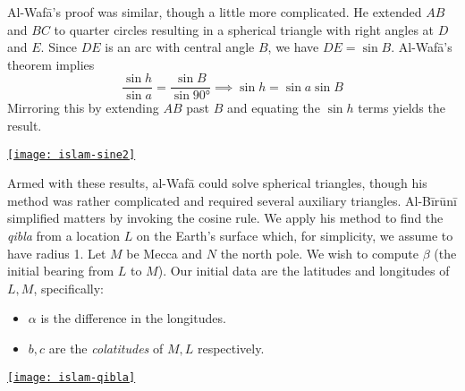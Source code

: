 \begin{minipage}[t]{0.65\linewidth}\vspace{0pt}
	Al-Wafā's proof was similar, though a little more complicated. He extended $AB$ and $BC$ to quarter circles resulting in a spherical triangle with right angles at $D$ and $E$. Since $DE$ is an arc with central angle $B$, we have $DE=\sin B$. Al-Wafā's theorem implies
	\[
		\frac{\sin h}{\sin a}=\frac{\sin B}{\sin \ang{90}}\implies \sin h=\sin a\sin B
	\]
	Mirroring this by extending $AB$ past $B$ and equating the $\sin h$ terms yields the result.
\end{minipage}
\hfill
\begin{minipage}[t]{0.34\linewidth}\vspace{-15pt}
	\flushright
	\href{http://math.uci.edu/~ndonalds/math184/islam-sine2.html}{\texttt{[image: islam-sine2]}}
\end{minipage}
\smallbreak

\begin{minipage}[t]{0.65\linewidth}\vspace{0pt}
	Armed with these results, al-Wafā could solve spherical triangles, though his method was rather complicated and required several auxiliary triangles. Al-Bīrūnī simplified matters by invoking the cosine rule. We apply his method to find the \emph{qibla} from a location $L$ on the Earth's surface which, for simplicity, we assume to have radius 1.\smallbreak
	Let $M$ be Mecca and $N$ the north pole. We wish to compute $\beta$ (the initial bearing from $L$ to $M$). Our initial data are the latitudes and longitudes of $L,M$, specifically:
	\begin{itemize}\itemsep0pt
	  \item $\alpha$ is the difference in the longitudes.
	  \item $b,c$ are the \emph{colatitudes}\footnotemark{} of $M,L$ respectively. 
	\end{itemize} 
\end{minipage}
\hfill
\begin{minipage}[t]{0.34\linewidth}\vspace{0pt}
	\flushright
	\href{http://math.uci.edu/~ndonalds/math184/islam-qibla.html}{\texttt{[image: islam-qibla]}}
\end{minipage}
\medbreak


